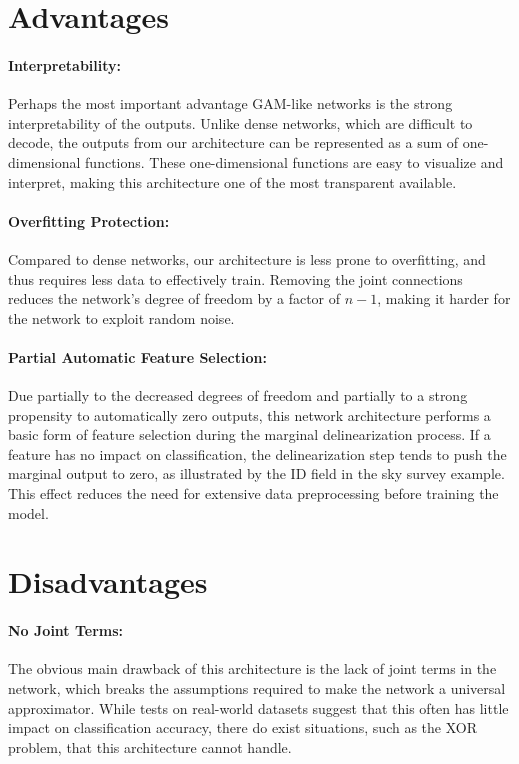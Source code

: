 \section{Advantages}

\paragraph{Interpretability:} Perhaps the most important advantage GAM-like networks is the strong interpretability of the outputs. Unlike dense networks, which are difficult to decode, the outputs from our architecture can be represented as a sum of one-dimensional functions. These one-dimensional functions are easy to visualize and interpret, making this architecture one of the most transparent available.

\paragraph{Overfitting Protection:} Compared to dense networks, our architecture is less prone to overfitting, and thus requires less data to effectively train. Removing the joint connections reduces the network’s degree of freedom by a factor of $n - 1$, making it harder for the network to exploit random noise.

\paragraph{Partial Automatic Feature Selection:} Due partially to the decreased degrees of freedom and partially to a strong propensity to automatically zero outputs, this network architecture performs a basic form of feature selection during the marginal delinearization process. If a feature has no impact on classification, the delinearization step tends to push the marginal output to zero, as illustrated by the ID field in the sky survey example. This effect reduces the need for extensive data preprocessing before training the model.

\section{Disadvantages}

\paragraph{No Joint Terms:} The obvious main drawback of this architecture is the lack of joint terms in the network, which breaks the assumptions required to make the network a universal approximator. While  tests on real-world datasets suggest that this often has little impact on classification accuracy, there do exist situations, such as the XOR problem, that this architecture cannot handle.

